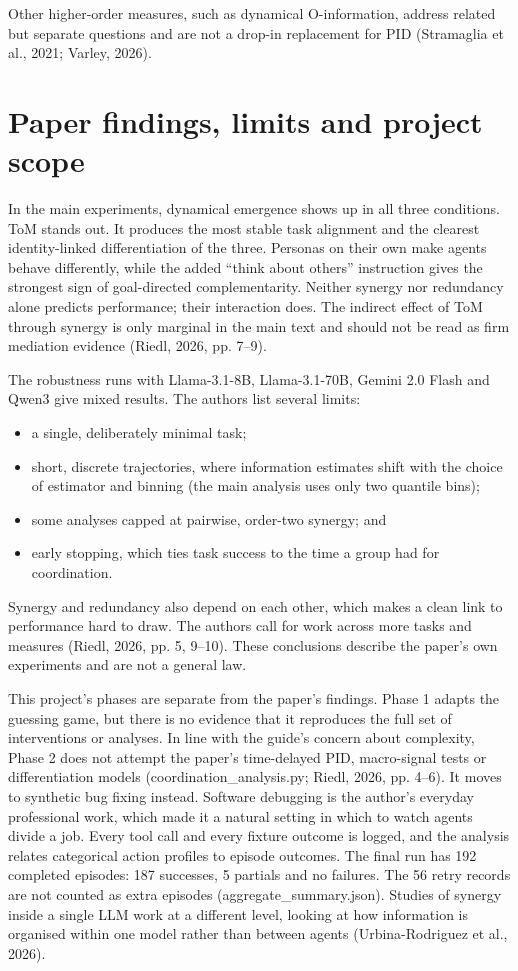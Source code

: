 \documentclass[12pt,a4paper,oneside]{report}
\begin{document}
Other higher-order measures, such as dynamical O-information, address related but separate questions and are not a drop-in replacement for PID (Stramaglia et al., 2021; Varley, 2026).

\section{Paper findings, limits and project scope}
In the main experiments, dynamical emergence shows up in all three conditions. ToM stands out. It produces the most stable task alignment and the clearest identity-linked differentiation of the three. Personas on their own make agents behave differently, while the added “think about others” instruction gives the strongest sign of goal-directed complementarity. Neither synergy nor redundancy alone predicts performance; their interaction does. The indirect effect of ToM through synergy is only marginal in the main text and should not be read as firm mediation evidence (Riedl, 2026, pp. 7–9).

The robustness runs with Llama-3.1-8B, Llama-3.1-70B, Gemini 2.0 Flash and Qwen3 give mixed results. The authors list several limits:
\begin{itemize}
\item a single, deliberately minimal task;
\item short, discrete trajectories, where information estimates shift with the choice of estimator and binning (the main analysis uses only two quantile bins);
\item some analyses capped at pairwise, order-two synergy; and
\item early stopping, which ties task success to the time a group had for coordination.
\end{itemize}
Synergy and redundancy also depend on each other, which makes a clean link to performance hard to draw. The authors call for work across more tasks and measures (Riedl, 2026, pp. 5, 9–10). These conclusions describe the paper’s own experiments and are not a general law.

This project’s phases are separate from the paper’s findings. Phase 1 adapts the guessing game, but there is no evidence that it reproduces the full set of interventions or analyses. In line with the guide’s concern about complexity, Phase 2 does not attempt the paper’s time-delayed PID, macro-signal tests or differentiation models (coordination\allowbreak\_analysis.py; Riedl, 2026, pp. 4–6). It moves to synthetic bug fixing instead. Software debugging is the author’s everyday professional work, which made it a natural setting in which to watch agents divide a job. Every tool call and every fixture outcome is logged, and the analysis relates categorical action profiles to episode outcomes. The final run has 192 completed episodes: 187 successes, 5 partials and no failures. The 56 retry records are not counted as extra episodes (aggregate\allowbreak\_summary.json). Studies of synergy inside a single LLM work at a different level, looking at how information is organised within one model rather than between agents (Urbina-Rodriguez et al., 2026).
\end{document}
